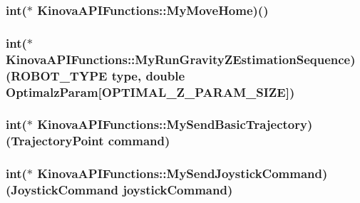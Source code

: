 \subsubsection[{\texorpdfstring{My\+Move\+Home}{MyMoveHome}}]{\setlength{\rightskip}{0pt plus 5cm}int($\ast$ Kinova\+A\+P\+I\+Functions\+::\+My\+Move\+Home)()}\hypertarget{classKinovaAPIFunctions_a9a0b47551e606f15c4af278ea590f432}{}\label{classKinovaAPIFunctions_a9a0b47551e606f15c4af278ea590f432}
\subsubsection[{\texorpdfstring{My\+Run\+Gravity\+Z\+Estimation\+Sequence}{MyRunGravityZEstimationSequence}}]{\setlength{\rightskip}{0pt plus 5cm}int($\ast$ Kinova\+A\+P\+I\+Functions\+::\+My\+Run\+Gravity\+Z\+Estimation\+Sequence)(R\+O\+B\+O\+T\+\_\+\+T\+Y\+PE type, double Optimalz\+Param\mbox{[}O\+P\+T\+I\+M\+A\+L\+\_\+\+Z\+\_\+\+P\+A\+R\+A\+M\+\_\+\+S\+I\+ZE\mbox{]})}\hypertarget{classKinovaAPIFunctions_aa85f280eadaef3a3add5d1678ff6800d}{}\label{classKinovaAPIFunctions_aa85f280eadaef3a3add5d1678ff6800d}
\subsubsection[{\texorpdfstring{My\+Send\+Basic\+Trajectory}{MySendBasicTrajectory}}]{\setlength{\rightskip}{0pt plus 5cm}int($\ast$ Kinova\+A\+P\+I\+Functions\+::\+My\+Send\+Basic\+Trajectory)(Trajectory\+Point command)}\hypertarget{classKinovaAPIFunctions_a7d3719b97975ce3e016fb5777f10d309}{}\label{classKinovaAPIFunctions_a7d3719b97975ce3e016fb5777f10d309}
\subsubsection[{\texorpdfstring{My\+Send\+Joystick\+Command}{MySendJoystickCommand}}]{\setlength{\rightskip}{0pt plus 5cm}int($\ast$ Kinova\+A\+P\+I\+Functions\+::\+My\+Send\+Joystick\+Command)(Joystick\+Command joystick\+Command)}\hypertarget{classKinovaAPIFunctions_ae63ffc76f91f13394d906c92984cccf3}{}\label{classKinovaAPIFunctions_ae63ffc76f91f13394d906c92984cccf3}

